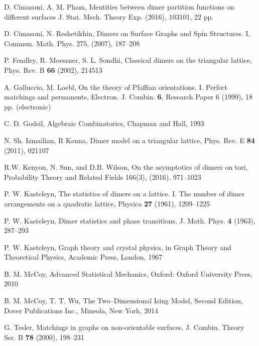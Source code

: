 \documentclass[12pt,reqno]{amsart}
\numberwithin{equation}{section}
\begin{document}
\begin{thebibliography}{99}

D. Cimasoni, A. M. Pham,
Identities between dimer partition functions on different surfaces
J. Stat. Mech. Theory Exp. (2016), 103101, 22 pp. 

D. Cimasoni, N. Reshetikhin, Dimers on Surface Graphs and Spin Structures. I, Commun. Math. Phys. 275, (2007), 187--208

P. Fendley, R. Moessner, S. L. Sondhi, Classical dimers on the triangular lattice, Phys. Rev. B {\bf 66} (2002), 214513

A. Galluccio, M. Loebl, On the theory of Pfaffian orientations. I. Perfect matchings and permanents, Electron. J. Combin. {\bf 6}, Research Paper 6 (1999), 18 pp. (electronic)

C. D. Godsil, Algebraic Combinatorics, Chapman and Hall, 1993

N. Sh. Izmailian, R Kenna,
Dimer model on a triangular lattice, Phys. Rev. E {\bf 84} (2011), 021107

R.W. Kenyon, N. Sun, and D.B. Wilson, On the asymptotics of dimers on tori, Probability Theory and Related Fields 166(3), (2016), 971--1023

P. W. Kasteleyn,
The statistics of dimers on a lattice. I. The number of dimer arrangements on a quadratic lattice,
Physica {\bf 27} (1961), 1209--1225

P. W. Kasteleyn, Dimer statistics and phase transitions, J. Math. Phys. {\bf 4} (1963), 287--293

P. W. Kasteleyn, Graph theory and crystal physics, in Graph Theory and Theoretical Physics, Academic Press, London, 1967

B. M. McCoy, Advanced Statistical Mechanics, Oxford: Oxford University Press, 2010

B. M. McCoy, T. T. Wu, The Two--Dimensional Ising Model, Second Edition, Dover Publications Inc., Mineola, New York, 2014

G. Tesler, Matchings in graphs on non-orientable surfaces, J. Combin. Theory Ser. B {\bf 78} (2000), 198--231

\end{thebibliography}
\end{document}
